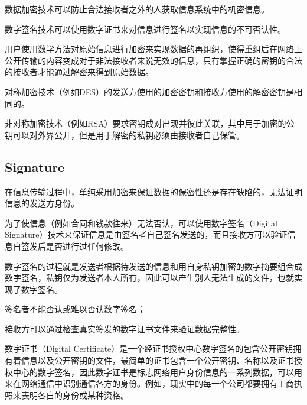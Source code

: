 \begin{compactitem}
\item 数据加密技术可以防止合法接收者之外的人获取信息系统中的机密信息。

\item 数字签名技术可以使用数字证书来对信息进行签名以实现信息的不可否认性。
\end{compactitem}

用户使用数学方法对原始信息进行加密来实现数据的再组织，使得重组后在网络上公开传输的内容变成对于非法接收者来说无效的信息，只有掌握正确的密钥的合法的接收者才能通过解密来得到原始数据。

\begin{compactitem}
\item 对称加密技术（例如DES）的发送方使用的加密密钥和接收方使用的解密密钥是相同的。

\item 非对称加密技术（例如RSA）要求密钥成对出现并彼此关联，其中用于加密的公钥可以对外界公开，但是用于解密的私钥必须由接收者自己保管。
\end{compactitem}

\subsection{Signature}

在信息传输过程中，单纯采用加密来保证数据的保密性还是存在缺陷的，无法证明信息的发送方身份。

为了使信息（例如合同和钱款往来）无法否认，可以使用数字签名（Digital Signature）技术来保证信息是由签名者自己签名发送的，而且接收方可以验证信息自签发后是否进行过任何修改。

数字签名的过程就是发送者根据待发送的信息和用自身私钥加密的数字摘要组合成数字签名，私钥仅为发送者本人所有，因此可以产生别人无法生成的文件，也就实现了数字签名。



\begin{compactitem}
\item 签名者不能否认或难以否认数字签名；
\item 接收方可以通过检查真实签发的数字证书文件来验证数据完整性。
\end{compactitem}

数字证书（Digital Certificate）是一个经证书授权中心数字签名的包含公开密钥拥有着信息以及公开密钥的文件，最简单的证书包含一个公开密钥、名称以及证书授权中心的数字签名，因此数字证书是标志网络用户身份信息的一系列数据，可以用来在网络通信中识别通信各方的身份。例如，现实中的每一个公司都要拥有工商执照来表明各自的身份或某种资格。

